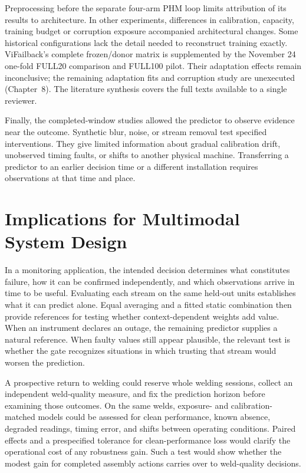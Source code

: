 Preprocessing before the separate four-arm PHM loop limits attribution of its results to architecture. In other experiments, differences in calibration, capacity, training budget or corruption exposure accompanied architectural changes. Some historical configurations lack the detail needed to reconstruct training exactly. ViFailback's complete frozen/donor matrix is supplemented by the November 24 one-fold FULL20 comparison and FULL100 pilot. Their adaptation effects remain inconclusive; the remaining adaptation fits and corruption study are unexecuted (Chapter~8). The literature synthesis covers the full texts available to a single reviewer.

Finally, the completed-window studies allowed the predictor to observe evidence near the outcome. Synthetic blur, noise, or stream removal test specified interventions. They give limited information about gradual calibration drift, unobserved timing faults, or shifts to another physical machine. Transferring a predictor to an earlier decision time or a different installation requires observations at that time and place.

\section{Implications for Multimodal System Design}
In a monitoring application, the intended decision determines what constitutes failure, how it can be confirmed independently, and which observations arrive in time to be useful. Evaluating each stream on the same held-out units establishes what it can predict alone. Equal averaging and a fitted static combination then provide references for testing whether context-dependent weights add value. When an instrument declares an outage, the remaining predictor supplies a natural reference. When faulty values still appear plausible, the relevant test is whether the gate recognizes situations in which trusting that stream would worsen the prediction.

A prospective return to welding could reserve whole welding sessions, collect an independent weld-quality measure, and fix the prediction horizon before examining those outcomes. On the same welds, exposure- and calibration-matched models could be assessed for clean performance, known absence, degraded readings, timing error, and shifts between operating conditions. Paired effects and a prespecified tolerance for clean-performance loss would clarify the operational cost of any robustness gain. Such a test would show whether the modest gain for completed assembly actions carries over to weld-quality decisions.
